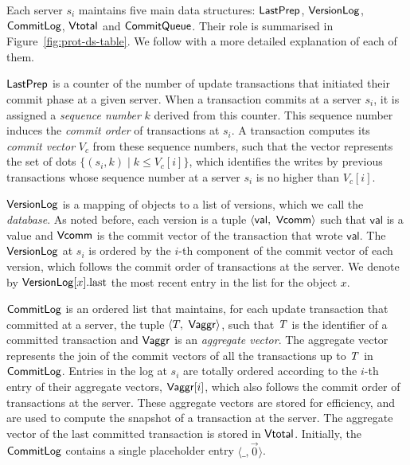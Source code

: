  Each server $s_i$ maintains five main data structures: $\mathsf{LastPrep}$, $\mathsf{VersionLog}$, $\mathsf{CommitLog}$, $\mathsf{Vtotal}$ and $\mathsf{CommitQueue}$. Their role is summarised in Figure~\ref{fig:prot-ds-table}. We follow with a more detailed explanation of each of them.

$\mathsf{LastPrep}$ is a counter of the number of update transactions that initiated their commit phase at a given server. When a transaction commits at a server $s_i$, it is assigned a \emph{sequence number} $k$ derived from this counter. This sequence number induces the \emph{commit order} of transactions at $s_i$. A transaction computes its \emph{commit vector} $V_c$ from these sequence numbers, such that the vector represents the set of dots $\{(s_i, k) \mid k \le V_c[i]\}$, which identifies the writes by previous transactions whose sequence number at a server $s_i$ is no higher than $V_c[i]$.

$\mathsf{VersionLog}$ is a mapping of objects to a list of versions, which we call the \emph{database}. As noted before, each version is a tuple $\langle \mathsf{val},\ \mathsf{Vcomm} \rangle$ such that $\mathsf{val}$ is a value and $\mathsf{Vcomm}$ is the commit vector of the transaction that wrote $\mathsf{val}$. The $\mathsf{VersionLog}$ at $s_i$ is ordered by the $i$-th component of the commit vector of each version, which follows the commit order of transactions at the server. We denote by $\mathsf{VersionLog}[x].{\rm last}$ the most recent entry in the list for the object $x$.

$\mathsf{CommitLog}$ is an ordered list that maintains, for each update transaction that committed at a server, the tuple $\langle T,\ \mathsf{Vaggr} \rangle$, such that $\mathit{T}$ is the identifier of a committed transaction and $\mathsf{Vaggr}$ is an \emph{aggregate vector}. The aggregate vector represents the join of the commit vectors of all the transactions up to $\mathit{T}$ in $\mathsf{CommitLog}$. Entries in the log at $s_i$ are totally ordered according to the $i$-th entry of their aggregate vectors, $\mathsf{Vaggr}[i]$, which also follows the commit order of transactions at the server. These aggregate vectors are stored for efficiency, and are used to compute the snapshot of a transaction at the server. The aggregate vector of the last committed transaction is stored in $\mathsf{Vtotal}$. Initially, the $\mathsf{CommitLog}$ contains a single placeholder entry $\langle \_, \vec{0} \rangle$.

